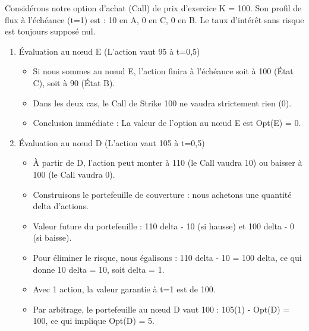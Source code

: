 \begin{examplebox}
Considérons notre option d'achat (Call) de prix d'exercice K = 100. Son profil de flux à l'échéance (t=1) est : 10 en A, 0 en C, 0 en B. Le taux d'intérêt sans risque est toujours supposé nul.

\begin{enumerate}[label=Étape \arabic* :, leftmargin=*]
    
    \item Évaluation au nœud E (L'action vaut 95 à t=0,5)
    \begin{itemize}[label=$\cdot$]
        \item Si nous sommes au nœud E, l'action finira à l'échéance soit à 100 (État C), soit à 90 (État B). 
        \item Dans les deux cas, le Call de Strike 100 ne vaudra strictement rien (0).
        \item Conclusion immédiate : La valeur de l'option au nœud E est Opt(E) = 0.
    \end{itemize}
    
    \vspace{0.2cm}
    \item Évaluation au nœud D (L'action vaut 105 à t=0,5)
    \begin{itemize}[label=$\cdot$]
        \item À partir de D, l'action peut monter à 110 (le Call vaudra 10) ou baisser à 100 (le Call vaudra 0).
        \item Construisons le portefeuille de couverture : nous achetons une quantité delta d'actions.
        \item Valeur future du portefeuille : 110 delta - 10 (si hausse) et 100 delta - 0 (si baisse).
        \item Pour éliminer le risque, nous égalisons : 110 delta - 10 = 100 delta, ce qui donne 10 delta = 10, soit delta = 1.
        \item Avec 1 action, la valeur garantie à t=1 est de 100.
        \item Par arbitrage, le portefeuille au nœud D vaut 100 : 105(1) - Opt(D) = 100, ce qui implique Opt(D) = 5.
    \end{itemize}


\end{enumerate}
\end{examplebox}
